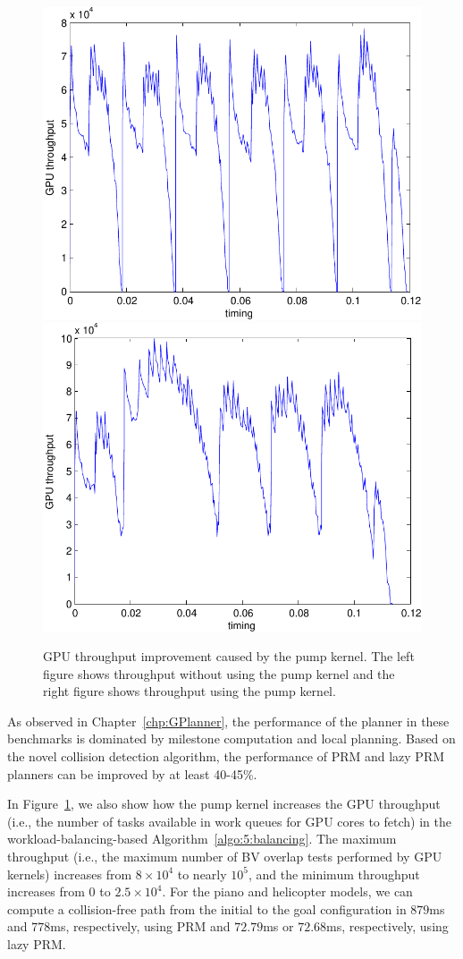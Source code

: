 \begin{figure}[h!]
  \centering
  \includegraphics[width=0.8\linewidth]{figs/5/nopump.pdf}
  \includegraphics[width=0.8\linewidth]{figs/5/pump.pdf}
  \caption[GPU throughput improvement caused by pump kernel]{GPU throughput improvement caused by the pump kernel. The left figure shows throughput without using the pump kernel
  and the right figure shows throughput using the pump kernel.}
  \label{fig:5:pump}
\end{figure}

As observed in Chapter~\ref{chp:GPlanner}, the performance of the planner in these benchmarks is
dominated by milestone computation and local planning. Based on the novel collision detection algorithm, the performance of PRM
and lazy PRM planners can be improved by at least 40-45\%.

In Figure~\ref{fig:5:pump}, we also show how the pump kernel increases the GPU throughput (i.e., the number of
tasks available in work queues for GPU cores to fetch) in the workload-balancing-based Algorithm~\ref{algo:5:balancing}.
The maximum throughput (i.e., the maximum number of BV overlap tests performed by GPU kernels) increases from $8\times 10^4$
to nearly $10^5$, and the minimum throughput increases from $0$ to $2.5\times 10^4$. For the piano and helicopter models,
we can compute a collision-free path from the initial to the goal configuration in $879$ms and $778$ms, respectively,
using PRM and $72.79$ms or $72.68$ms, respectively, using lazy PRM.



